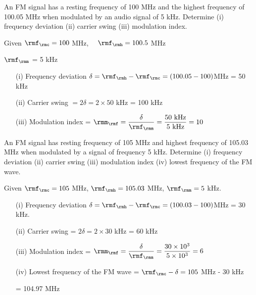 \begin{problem}\label{prob8.20}
An FM signal has a resting frequency of 100 MHz and the highest
frequency of 100.05 MHz when modulated by an audio signal of 5
kHz. Determine (i) frequency deviation (ii) carrier swing (iii)
modulation index.
\end{problem}

\eject

\begin{solution}
Given $\rmf_\rmc = 100$ MHz, ~~$\rmf_\rmh = 100.5$ MHz

\hspace{1.9cm} $\rmf_\rmm$ = 5 kHz
\begin{itemize}
\item[(i)] Frequency deviation $\delta = \rmf_\rmh - \rmf_\rmc = (100.05-100)$MHz
= 50 kHz

\item[(ii)] Carrier swing $= 2 \delta = 2 \times 50$ kHz = 100 kHz

\item[(iii)] Modulation index = $\rmm_\rmf = \dfrac{\delta}{\rmf_\rmm} = \dfrac{50
\text{ kHz}}{5 \text{ kHz}} = 10$
\end{itemize}
\end{solution}

\begin{problem}\label{prob8.21}
An FM signal has resting frequency of 105 MHz and highest frequency of
105.03 MHz when modulated by a signal of frequency 5 kHz. Determine
(i) frequency deviation (ii) carrier swing (iii) modulation index (iv)
lowest frequency of the FM wave.
\end{problem}

\begin{solution}
Given $\rmf_\rmc = 105$ MHz, $\rmf_\rmh = 105.03$ MHz, $\rmf_\rmm = 5$
kHz.
\begin{itemize}
\item[(i)] Frequency deviation $\delta = \rmf_\rmh - \rmf_\rmc = (100.03 -
100)$MHz = 30 kHz.

\item[(ii)] Carrier swing = $2 \delta = 2 \times 30$ kHz = 60 kHz

\item[(iii)] Modulation index = $\rmm_\rmf = \dfrac{\delta}{\rmf_\rmm} = \dfrac{30
\times 10^3}{5 \times 10^3} = 6$

\item[(iv)] Lowest frequency of the FM wave = $\rmf_\rmc - \delta = 105$ MHz
- 30 kHz

\hspace{5.3cm} = 104.97 MHz
\end{itemize}
\end{solution}

